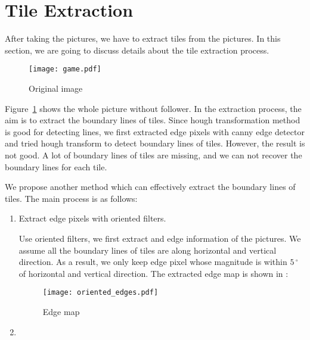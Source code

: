 \section{Tile Extraction}
After taking the pictures, we have to extract tiles from the pictures.
In this section, we are going to discuss details about the tile 
extraction process.


\begin{figure}[htbp]
	  \centering
	  \texttt{[image: game.pdf]}
	  \caption{Original image}
	  \label{Original_im}
\end{figure}

Figure~\ref{Original_im} shows the whole picture without follower. 
In the extraction process, the aim is to extract the boundary lines of 
tiles. Since hough transformation method is good for detecting lines, we
first extracted edge pixels with canny edge detector and tried hough 
transform to detect boundary lines of tiles. However, the result is not 
good. A lot of boundary lines of tiles are missing, and we can not recover 
the boundary lines for each tile.

We propose another method which can effectively extract the boundary lines of
 tiles. The main process is as follows:
\begin{enumerate}
	\item Extract edge pixels with oriented filters.
	
			Use oriented filters, we first extract and edge information of the 
			pictures. We assume all the boundary lines of tiles are along horizontal 
			and vertical direction. As a result, we only keep edge pixel whose 
			magnitude is within $5\,^{\circ}$ of horizontal and vertical direction. 
			The extracted edge map is shown in :
			
			
			\begin{figure}[htbp]
				  \centering
				  \texttt{[image: oriented\_edges.pdf]}
				  \caption{Edge map}
				  \label{Edge_map}
			\end{figure}
	\item
\end{enumerate}

 

